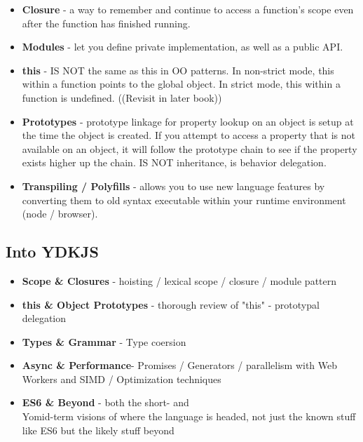 \begin{itemize}
\item \textbf{Closure} - a way to remember and continue to access a function's scope even after the function has finished running.
\item \textbf{Modules} - let you define private implementation, as well as a public API.
\item \textbf{this} - IS NOT the same as this in OO patterns. In non-strict mode, this within a function points to the global object. In strict mode, this within a function is undefined. ((Revisit in later book))
\item \textbf{Prototypes} - prototype linkage for property lookup on an object is setup at the time the object is created. If you attempt to access a property that is not available on an object, it will follow the prototype chain to see if the property exists higher up the chain. IS NOT inheritance, is behavior delegation.
\item \textbf{Transpiling / Polyfills} - allows you to use new language features by converting them to old syntax executable within your runtime environment (node / browser).
\end{itemize}
\subsection{Into YDKJS}
\begin{itemize}
\item \textbf{Scope \& Closures} - hoisting / lexical scope / closure / module pattern
\item \textbf{this \& Object Prototypes} - thorough review of "this" - prototypal delegation
\item \textbf{Types \& Grammar} - Type coersion
\item \textbf{Async \& Performance}- Promises / Generators / parallelism with Web Workers and SIMD / Optimization techniques
\item \textbf{ES6 \& Beyond} - both the short- and \\Yomid-term visions of where the language is headed, not just the known stuff like ES6 but the likely stuff beyond
\end{itemize}

\onecolumn
